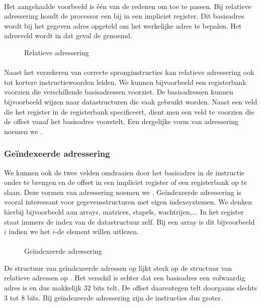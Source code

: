 \paragraph{}
Het aangehaalde voorbeeld is \'e\'en van de redenen om  toe te passen. Bij relatieve adressering houdt de processor een  bij in een impliciet register. Dit basisadres wordt bij het gegeven adres opgeteld om het werkelijke adres te bepalen. Het adresveld wordt in dat geval de  genoemd.
\begin{figure}[hbt]
\centering
{}
\caption{Relatieve adressering}
\end{figure}
\paragraph{}
Naast het verzekeren van correcte spronginstructies kan relatieve adressering ook tot kortere instructiewoorden leiden. We kunnen bijvoorbeeld een registerbank voorzien die verschillende basisadressen voorziet. De basisadressen kunnen bijvoorbeeld wijzen naar datastructuren die vaak gebruikt worden. Naast een veld die het register in de registerbank specificeert, dient men een veld te voorzien die de offset vanaf het basisadres voorstelt. Een dergelijke vorm van adressering noemen we .
\subsubsection{Ge\"indexeerde adressering}
We kunnen ook de twee velden omdraaien door het basisadres in de instructie onder te brengen en de offset in een impliciet register of een registerbank op te slaan. Deze vormen van adressering noemen we . Ge\"indexeerde adressering is vooral interessant voor gegevensstructuren met eigen indexsystemen. We denken hierbij bijvoorbeeld aan arrays, matrices, stapels, wachtrijen,... In het register staat immers de index van de datastructuur zelf. Bij een array is dit bijvoorbeeld $i$ indien we het $i$-de element willen uitlezen.
\paragraph{}
\begin{figure}[hbt]
\centering
{}
\caption{Ge\"indexeerde adressering}
\end{figure}
De structuur van ge\"indexeerde adressen op  lijkt sterk op de structuur van relatieve adressen op . Het verschil is echter dat een basisadres een volwaardig adres is en dus makkelijk $32$ bits telt. De offset daarentegen telt doorgaans slechts $3$ tot $8$ bits. Bij ge\"indexeerde adressering zijn de instructies dus groter.
